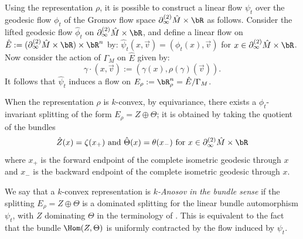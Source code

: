 
Using the representation $\rho$, it is possible to construct a linear 
flow $\psi_t$ over the geodesic flow $\phi_t$ of 
the Gromov flow space $\partial^{(2)}_\infty \hat M \times \bR$ as follows. 
Consider the lifted geodesic flow $\hat \phi_t$ on 
$\partial^{(2)}_\infty \hat M \times \bR$, and
define a linear flow on $\hat E := 
(\partial^{(2)}_\infty \hat M \times \bR)\times\bR^n$ by:
$\hat\psi_t(x,\vec{v})=(\phi_t(x), \vec{v})$ for $x\in\partial^{(2)}_\infty \hat M \times \bR$.
Now consider the action of $\Gamma_M$ on $\hat E$ given by:
\[ \gamma \cdot \left(x, \vec{v}\right):= 
\left(\gamma(x), \rho(\gamma)(\vec{v})\right). \] 
It follows that $\hat \psi_t$ induces a flow on $E_\rho:=\bR^n_{\rho}= \hat E/\Gamma_M$. 

When the representation $\rho$ is $k$-convex, by equivariance, there exists a $\phi_t$-invariant splitting of the form $E_\rho = Z \oplus \Theta$; 
it is obtained by taking the quotient of the bundles
\[\hat Z(x) = \zeta(x_+) \text{ and }
\hat \Theta(x) = \theta(x_-)
\text{ for } x \in \partial^{(2)}_\infty \hat M \times \bR\]
where $x_+$ is the forward endpoint of 
the complete isometric geodesic through $x$ and 
$x_-$ is the backward endpoint of the complete isometric geodesic through $x$. 

We say that a $k$-convex representation is {\em $k$-Anosov
in the bundle sense} if the splitting 
$E_\rho=Z\oplus\Theta$ is a dominated splitting for the linear bundle automorphism $\psi_t$, with $Z$ dominating $\Theta$ in the terminology of \cite{BPS}. 
This is equivalent to the fact that the bundle $\Hom(Z,\Theta)$ is uniformly contracted
by the flow induced by $\psi_t$. 


%

